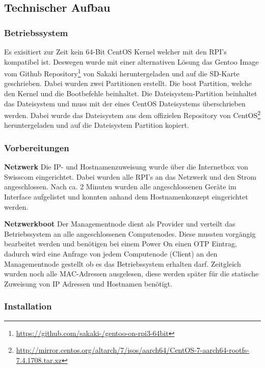\subsection{Technischer Aufbau}
\subsubsection{Betriebssystem}
Es exisitiert zur Zeit kein 64-Bit CentOS Kernel welcher mit den RPI's kompatibel ist. Deswegen wurde mit einer alternativen Lösung das Gentoo Image vom Github Repository\footnote{\url{https://github.com/sakaki-/gentoo-on-rpi3-64bit}} von Sakaki heruntergeladen und auf die SD-Karte geschrieben. Dabei wurden zwei Partitionen erstellt. Die boot Partition, welche den Kernel und die Bootbefehle beinhaltet. Die Dateisystem-Partition beinhaltet das Dateisystem und muss mit der eines CentOS Dateisystems überschrieben werden. Dabei wurde das Dateisystem aus dem offizielen Repository von CentOS\footnote{\url{http://mirror.centos.org/altarch/7/isos/aarch64/CentOS-7-aarch64-rootfs-7.4.1708.tar.xz}} heruntergeladen und auf die Dateisystem Partition kopiert.

\subsubsection{Vorbereitungen}
\textbf{Netzwerk}\newline
Die IP- und Hostnamenzuweisung wurde über die Internetbox von Swisscom eingerichtet. Dabei wurden alle RPI's an das Netzwerk und den Strom angeschlossen. Nach ca. 2 Minuten wurden alle angeschlossenen Geräte im Interface aufgelistet und konnten anhand dem Hostnamenkonzept eingerichtet werden.

\textbf{Netzwerkboot}\newline
Der Managementnode dient als Provider und verteilt das Betriebssystem an alle angeschlossenen Computenodes. Diese mussten vorgängig bearbeitet werden und benötigen bei einem Power On einen OTP Eintrag, dadurch wird eine Anfrage von jedem Computenode (Client) an den Managementnode gestellt ob es das Betriebssystem erhalten darf. Zeitgleich wurden noch alle MAC-Adressen ausgelesen, diese werden später für die statische Zuweisung von IP Adressen und Hostnamen benötigt.

\subsubsection{Installation}

